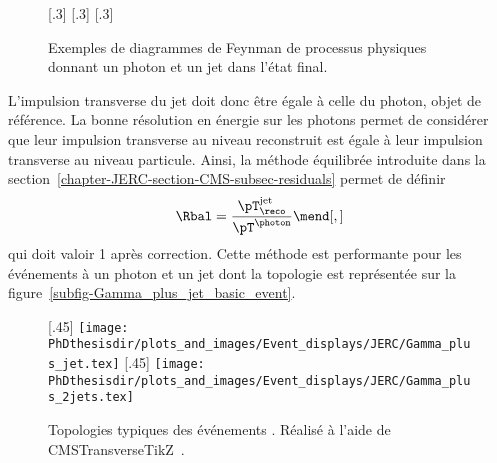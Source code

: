 \begin{figure}[h]
\centering\vspace{\baselineskip}
\subcaptionbox{\label{subfig-fgraph-gq_qGamma_S}}[.3\textwidth]
{\vspace{\baselineskip}}
\hfill
\subcaptionbox{\label{subfig-fgraph-gq_qGamma_T}}[.3\textwidth]
{\vspace{\baselineskip}}
\hfill
\subcaptionbox{\label{subfig-fgraph-qq_gGamma}}[.3\textwidth]
{\vspace{\baselineskip}}
\caption[Diagrammes de Feynman donnant un photon et un jet dans l'état final.]{Exemples de diagrammes de Feynman de processus physiques donnant un photon et un jet dans l'état final.}
\label{fig-fgraph-gamma_plus_jets}
\end{figure}
\par L'impulsion transverse du jet doit donc être égale à celle du photon, objet de référence.
La bonne résolution en énergie sur les photons permet de considérer que leur impulsion transverse au niveau reconstruit est égale à leur impulsion transverse au niveau particule.
Ainsi, la méthode équilibrée introduite dans la section~\ref{chapter-JERC-section-CMS-subsec-residuals} permet de définir
\begin{equation}
\Rbal = \frac{\pT_\reco^\text{jet}}{\pT^{\photon}}
\mend[,]
\end{equation}
qui doit valoir 1 après correction.
Cette méthode est performante pour les événements à un photon et un jet dont la topologie est représentée sur la figure~\ref{subfig-Gamma_plus_jet_basic_event}.
\begin{figure}[h]
\centering
{}[.45\textwidth]
{\texttt{[image: \\PhDthesisdir/plots\_and\_images/Event\_displays/JERC/Gamma\_plus\_jet.tex]}}
\hfill
{}[.45\textwidth]
{\texttt{[image: \\PhDthesisdir/plots\_and\_images/Event\_displays/JERC/Gamma\_plus\_2jets.tex]}}
\caption[Topologies typiques des événements \Gjets.]{Topologies typiques des événements \Gjets. Réalisé à l'aide de CMSTransverseTikZ~\cite{CMSTransverseTikZ}.}
\label{fig-Gamma_plus_jet_events}
\end{figure}
